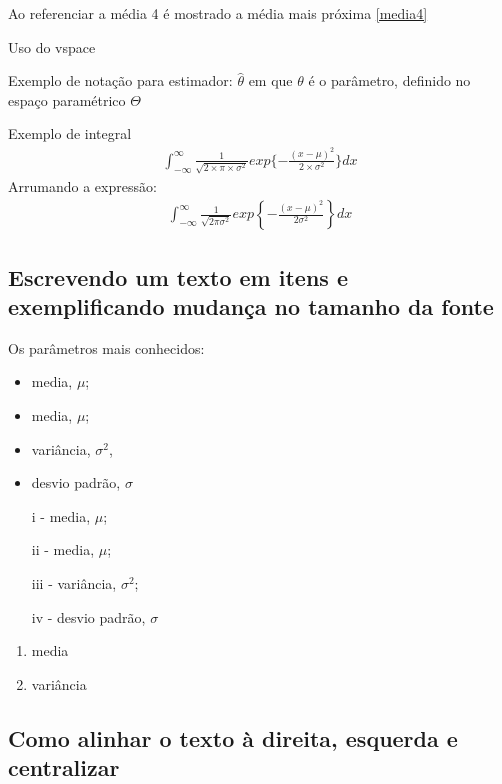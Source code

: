 \documentclass[a4paper, 11pt]{book}  %
\begin{document}
Ao referenciar a média 4 é mostrado a média mais próxima
\ref{media4}

\vspace{5cm}
Uso do vspace
\vspace{5cm}

Exemplo de notação para estimador: $\hat{\theta}$ em que $\theta$ é o parâmetro, definido no espaço paramétrico $\Theta$

Exemplo de integral
\begin{eqnarray}
    \int_{-\infty}^{\infty}\frac{1}{\sqrt{2 \times \pi \times \sigma^2}}
    exp\{ -\frac{(x-\mu)^2}{2 \times \sigma^2}\} dx \nonumber
\end{eqnarray}
Arrumando a expressão:
\begin{eqnarray}
    \int_{-\infty}^{\infty}
    \frac{1}{\sqrt{2 \pi \sigma^2}}
    exp\left\{ -\frac{(x-\mu)^2}{2 \sigma^2}\right\} dx
    \label{int_normal}
\end{eqnarray}

\subsection{Escrevendo um texto em itens e exemplificando mudança no tamanho da fonte}

Os parâmetros mais conhecidos:

\begin{itemize}
    \item media, $\mu$;
    \item {\Large media, $\mu$;}
    \item {\LARGE variância, $\sigma^2$,}
    \item desvio padrão, $\sigma$
\end{itemize}

\begin{itemize}
    \item [i -] media, $\mu$;
    \item [ii -] {\Large media, $\mu$;}
    \item [iii -] {\LARGE variância, $\sigma^2$;}
    \item [iv -] desvio padrão, $\sigma$
\end{itemize}

\begin{enumerate}
    \item {media}
    \item {variância}
\end{enumerate}

\newpage
\subsection{Como alinhar o texto à direita, esquerda e centralizar}
\end{document}
